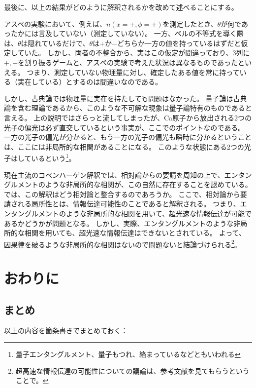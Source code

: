 \documentclass[10pt,b5paper,papersize,dvipdfmx]{jsbook}
\begin{document}
最後に、以上の結果がどのように解釈されるかを改めて述べることにする。\par
アスペの実験において、例えば、$n(x=+,\phi=+)$を測定したとき、$\theta$が何であったかには言及していない（測定していない）。
一方、ベルの不等式を導く際は、$\theta$は隠れているだけで、$\theta$は$+$か$-$どちらか一方の値を持っているはずだと仮定していた。
しかし、両者の不整合から、実はこの仮定が間違っており、3列に$+,-$を割り振るゲームと、アスぺの実験で考えた状況は異なるものであったといえる。
つまり、測定していない物理量に対し、確定したある値を常に持っている（実在している）とするのは間違いなのである。\par
しかし、古典論では物理量に実在を持たしても問題はなかった。
量子論は古典論を含む理論であるから、このような不可解な現象は量子論特有のものであると言える。
上の説明ではさらっと流してしまったが、Ca原子から放出される2つの光子の偏光は必ず直交しているという事実が、ここでのポイントなのである。
一方の光子の偏光が分かると、もう一方の光子の偏光も瞬時に分かるということは、ここには非局所的な相関があることになる。
このような状態にある2つの光子はしているという\footnote{
  量子エンタングルメント、量子もつれ、絡まっているなどともいわれる
}。\par
現在主流のコペンハーゲン解釈では、相対論からの要請を周知の上で、エンタングルメントのような非局所的な相関が、この自然に存在することを認めている。
では、この解釈はどう相対論と整合するのであろうか。
ここで、相対論から要請される局所性とは、情報伝達可能性のことであると解釈される。
つまり、エンタングルメントのような非局所的な相関を用いて、超光速な情報伝達が可能であるかどうかが問題となる。
しかし、実際、エンタングルメントのような非局所的な相関を用いても、超光速な情報伝達はできないとされている。
よって、因果律を破るような非局所的な相関はないので問題ないと結論づけられる\footnote{
  超高速な情報伝達の可能性についての議論は、参考文献\cite{arafuna}を見てもらうということで。
}。

\fi
\section{おわりに}

\subsection{まとめ}
以上の内容を箇条書きでまとめておく：
\end{document}
